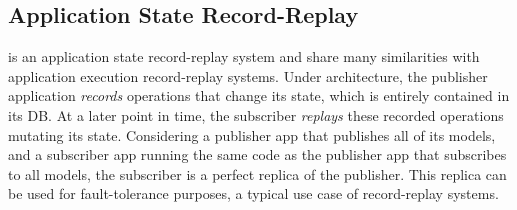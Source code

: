 \subsection{Application State Record-Replay}
\label{synapse:sec:record-replay}

\begin{table}[t]
 \caption{{\bf Similarities between \scribe and \synapse }
 Each row depicts the equivalent entity with \scribe and \synapse.}
 \label{synapse:tab:similarities}
\end{table}

\synapse is an application state record-replay system and share many
similarities with application execution record-replay systems.
Under \synapse architecture, the publisher application {\em records} operations that
change its state, which is entirely contained in its DB.  At a later
point in time, the subscriber {\em replays} these recorded operations mutating
its state. Considering a publisher app that publishes all of its models, and a
subscriber app running the same code as the publisher app that subscribes to all
models, the subscriber is a perfect replica of the publisher. This replica
can be used for fault-tolerance purposes, a typical use case of record-replay systems.

